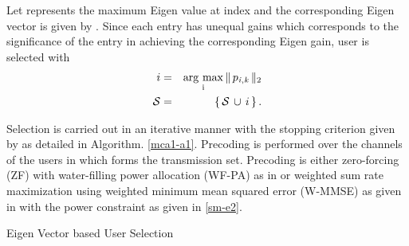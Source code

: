 Let  represents the maximum Eigen value at  index and the corresponding Eigen vector is given by . Since each entry  has unequal gains which corresponds to the significance of the entry in achieving the corresponding Eigen gain, user  is selected with
\begin{eqnarray}
i &=& \operatorname*{\arg\,max}_{\mathrm{i}} \|\, {p}_{\mathit{i},\mathit{k}} \,\|_{2} \label{mca1-e3:1} \\
\mathcal{S} &=& \left \lbrace \, \mathcal{S} \, \cup \, i \, \right \rbrace.
\label{mca1-e3}
\end{eqnarray}

Selection is carried out in an iterative manner with the stopping criterion given by  as detailed in Algorithm. \ref{mca1-a1}. Precoding is performed over the channels of the users in  which forms the transmission set. Precoding is either zero-forcing (ZF) with water-filling power allocation (WF-PA) as in \cite{tse2005fundamentals} or weighted sum rate maximization using weighted minimum mean squared error (W-MMSE) as given in \cite{wmmse_shi} with the power constraint as given in \eqref{sm-e2}.

\begin{algorithm}
 \SetAlgoLined
 \DontPrintSemicolon
 \caption{Eigen Vector based User Selection}
 \label{mca1-a1}
\end{algorithm}
